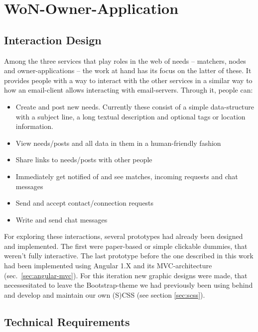 \documentclass[a4paper,,tablecaptionabove]{scrbook}
\providecommand{\tightlist}{%
  \setlength{\itemsep}{0pt}\setlength{\parskip}{0pt}}
\begin{document}
\hypertarget{sec:won-owner-application}{%
\section{WoN-Owner-Application}\label{sec:won-owner-application}}

\hypertarget{sec:interaction-design}{%
\subsection{Interaction Design}\label{sec:interaction-design}}

Among the three services that play roles in the web of needs --
matchers, nodes and owner-applications -- the work at hand has its focus
on the latter of these. It provides people with a way to interact with
the other services in a similar way to how an email-client allows
interacting with email-servers. Through it, people can:

\begin{itemize}
\tightlist
\item
  Create and post new needs. Currently these consist of a simple
  data-structure with a subject line, a long textual description and
  optional tags or location information.
\item
  View needs/posts and all data in them in a human-friendly fashion
\item
  Share links to needs/posts with other people
\item
  Immediately get notified of and see matches, incoming requests and
  chat messages
\item
  Send and accept contact/connection requests
\item
  Write and send chat messages
\end{itemize}

For exploring these interactions, several prototypes had already been
designed and implemented. The first were paper-based or simple clickable
dummies, that weren't fully interactive. The last prototype before the
one described in this work had been implemented using Angular 1.X and
its MVC-architecture (sec.~\ref{sec:angular-mvc}). For this iteration
new graphic designs were made, that necessesitated to leave the
Bootstrap-theme we had previously been using behind and develop and
maintain our own (S)CSS (see section \ref{sec:scss}).

\hypertarget{sec:technical-requirements}{%
\subsection{Technical Requirements}\label{sec:technical-requirements}}
\end{document}
